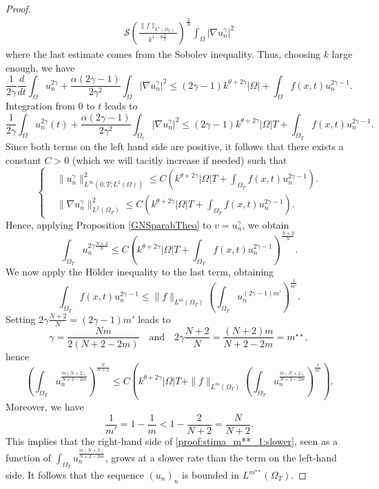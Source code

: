 \documentclass{amsart}
\numberwithin{equation}{section}
\def\elle#1{L^{#1}}
\def\elleom#1{L^{#1}(\Omega)}
\def\elleomT#1{L^{#1}(\Omega_T)}
\def\io{\int_\Omega}
\def\iot{\int_{\Omega_t}}
\def\ioT{\int_{\Omega_T}}
\def\norma#1#2{ \|#1 \|_{#2}}
\newcommand{\abs}[1]{\left|#1\right|}
\begin{document}
\begin{proof}
\begin{equation}
\begin{split}
        \mathcal{S}\left(\frac{\norma{f}{\elle1(\Omega_T)}}{k^{1-\theta\frac{N}{2}}}\right)^{\frac{2}{N}}\io\abs{\nabla u_n^\gamma}^2        
    \end{split}
\end{equation}
where the last estimate comes from the Sobolev inequality.
    Thus, choosing $k$ large enough, we have
    $$\frac{1}{{2\gamma}}\frac{d}{dt}\io u_n^{2\gamma}+
    \frac{\alpha(2\gamma-1)}{2\gamma^2}\io\abs{\nabla u_n^\gamma}^2
    \leq
     (2\gamma-1)k^{\theta+2\gamma}\abs{\Omega}+\io f(x,t)u_n^{2\gamma-1}.$$
    Integration from $0$ to $t$ leads to
    $$\frac{1}{{2\gamma}}\io u_n^{2\gamma}(t)+
    \frac{\alpha(2\gamma-1)}{2\gamma^2}\iot\abs{\nabla u_n^\gamma}^2
    \leq
     (2\gamma-1)k^{\theta+2\gamma}\abs{\Omega}T+\ioT f(x,t)u_n^{2\gamma-1}.$$
    Since both terms on the left hand side are positive, it follows that there exists a constant $C>0$ (which we will tacitly increase if needed) such that
    \begin{equation}\label{StimaGNSParabEllStampacchia2}
        \left\{\begin{aligned}
        & \norma{u_n^\gamma}{\elle\infty(0,T;\elleom2)}^2\leq C\left(k^{\theta+2\gamma}\abs{\Omega}T+\ioT f(x,t)u_n^{2\gamma-1}\right).\\
        & \norma{\nabla u_n^\gamma}{\elleomT2}^2\leq C\left(k^{\theta+2\gamma}\abs{\Omega}T+\ioT f(x,t)u_n^{2\gamma-1}\right).
        \end{aligned}\right.
    \end{equation}
    Hence, applying Proposition \ref{GNSparabTheo} to $v=u_n^\gamma$, we obtain
    $$
    \ioT u_n^{2\gamma\frac{N+2}{N}}
    \leq C\left(k^{\theta+2\gamma}\abs{\Omega}T+\ioT f(x,t)u_n^{2\gamma-1}\right)^\frac{N+2}{N}.
    $$
    We now apply the H\"older inequality to the last term, obtaining
    \begin{equation}\label{HolderRHSParabellstampacchia}
        \ioT f(x,t)u_n^{2\gamma-1}
        \leq
        \norma{f}{\elleomT m}\left(\ioT u_n^{(2\gamma-1)m'}\right)^\frac{1}{m'}.
    \end{equation}
    Setting $2\gamma\frac{N+2}{N}=(2\gamma-1)m'$ leads to
    $$\gamma=\frac{Nm}{2(N+2-2m)}\quad\text{and}\quad 2\gamma\frac{N+2}{N}= \frac{(N+2)m}{N+2-2m}=m^{\star\star},$$
    hence
    \begin{equation}\label{proof:stima_m**_1:slower}        
    \left(\ioT u_n^{\frac{m(N+2)}{N+2-2m}}\right)^\frac{N}{N+2}
    \leq
    C\left(k^{\theta+2\gamma}\abs{\Omega}T+
    \norma{f}{\elleomT m}\left(\ioT u_n^\frac{m(N+2)}{N+2-2m}\right)^\frac{1}{m'}\right).
    \end{equation}
    Moreover, we have
    $$\frac{1}{m'}=1-\frac{1}{m}<1-\frac{2}{N+2}=\frac{N}{N+2}.$$
    This implies that the right-hand side of \eqref{proof:stima_m**_1:slower}, seen as a function of $\ioT u_n^\frac{m(N+2)}{N+2-2m}$, grows at a slower rate than the term on the left-hand side. 
    It follows that the sequence $(u_n)_n$ is bounded in $\elleomT {m^{\star\star}}$.


\end{proof}
\end{document}
